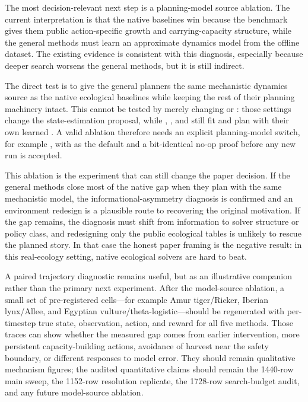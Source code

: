 \documentclass[11pt]{article}
\begin{document}
The most decision-relevant next step is a planning-model source ablation. The
current interpretation is that the native baselines win because the benchmark
gives them public action-specific growth and carrying-capacity structure, while
the general methods must learn an approximate dynamics model from the offline
dataset. The existing evidence is consistent with this diagnosis, especially
because deeper search worsens the general methods, but it is still indirect.

The direct test is to give the general planners the same mechanistic dynamics
source as the native ecological baselines while keeping the rest of their
planning machinery intact. This cannot be tested by merely changing
 or : those settings change the
state-estimation proposal, while , , and
 still fit and plan with their own learned
. A valid ablation therefore needs an explicit
planning-model switch, for example
, with
 as the default and a bit-identical no-op proof before any new
run is accepted.

This ablation is the experiment that can still change the paper decision. If
the general methods close most of the native gap when they plan with the same
mechanistic model, the informational-asymmetry diagnosis is confirmed and an
environment redesign is a plausible route to recovering the original
motivation. If the gap remains, the diagnosis must shift from information to
solver structure or policy class, and redesigning only the public ecological
tables is unlikely to rescue the planned story. In that case the honest paper
framing is the negative result: in this real-ecology setting, native ecological
solvers are hard to beat.

A paired trajectory diagnostic remains useful, but as an illustrative companion
rather than the primary next experiment. After the model-source ablation, a
small set of pre-registered cells---for example Amur tiger/Ricker, Iberian
lynx/Allee, and Egyptian vulture/theta-logistic---should be regenerated with
per-timestep true state, observation, action, and reward for all five methods.
Those traces can show whether the measured gap comes from earlier intervention,
more persistent capacity-building actions, avoidance of harvest near the safety
boundary, or different responses to model error. They should remain qualitative
mechanism figures; the audited quantitative claims should remain the 1440-row
main sweep, the 1152-row resolution replicate, the 1728-row search-budget
audit, and any future model-source ablation.
\end{document}
